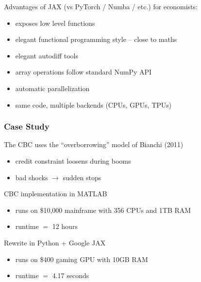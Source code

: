 \documentclass[
    xcolor={svgnames,dvipsnames},
    hyperref={colorlinks, citecolor=DeepPink4, linkcolor=DarkRed, urlcolor=DarkBlue}
    ]{beamer}  %
\newcommand{\1}{\mathbbm 1}
\begin{document}
\begin{frame}

    Advantages of JAX (vs PyTorch / Numba / etc.) for economists:
    \begin{itemize}
        \item exposes low level functions
            \vspace{0.5em}
        \item elegant functional programming style -- close to maths
            \vspace{0.5em}
        \item elegant autodiff tools
            \vspace{0.5em}
        \item array operations follow standard NumPy API
            \vspace{0.5em}
        \item automatic parallelization
            \vspace{0.5em}
        \item same code, multiple backends (CPUs, GPUs, TPUs)
    \end{itemize}

\end{frame}


\begin{frame}
    \frametitle{Case Study}

    The CBC uses the ``overborrowing'' model of Bianchi (2011)

    \begin{itemize}
        \item credit constraint loosens during booms
        \item bad shocks $\to$ sudden stops
    \end{itemize}

    \vspace{0.5em}
    CBC implementation in MATLAB 

    \begin{itemize}
        \item runs on \$10,000 mainframe with 356 CPUs and 1TB RAM
        \item runtime $=$ 12 hours
    \end{itemize}

    \pause
    \vspace{0.5em}
    Rewrite in Python + Google JAX

    \begin{itemize}
        \item runs on \$400 gaming GPU with 10GB RAM
        \item runtime $=$ 4.17 seconds
    \end{itemize}

\end{frame}
\end{document}
